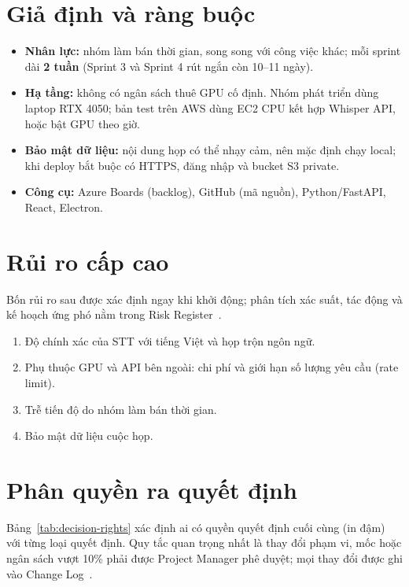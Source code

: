 \documentclass[12pt,a4paper]{report}
\begin{document}
\section{Giả định và ràng buộc}

\begin{itemize}
  \item \textbf{Nhân lực:} nhóm làm bán thời gian, song song với công việc khác; mỗi sprint dài
        \textbf{2 tuần} (Sprint 3 và Sprint 4 rút ngắn còn 10--11 ngày).
  \item \textbf{Hạ tầng:} không có ngân sách thuê GPU cố định. Nhóm phát triển dùng laptop RTX 4050; bản test
        trên AWS dùng EC2 CPU kết hợp Whisper API, hoặc bật GPU theo giờ.
  \item \textbf{Bảo mật dữ liệu:} nội dung họp có thể nhạy cảm, nên mặc định chạy local; khi deploy bắt buộc có
        HTTPS, đăng nhập và bucket S3 private.
  \item \textbf{Công cụ:} Azure Boards (backlog), GitHub (mã nguồn), Python/FastAPI, React, Electron.
\end{itemize}

\section{Rủi ro cấp cao}

Bốn rủi ro sau được xác định ngay khi khởi động; phân tích xác suất, tác động và kế hoạch ứng phó nằm trong
Risk Register~\cite{pmp}.
\begin{enumerate}
  \item Độ chính xác của STT với tiếng Việt và họp trộn ngôn ngữ.
  \item Phụ thuộc GPU và API bên ngoài: chi phí và giới hạn số lượng yêu cầu (rate limit).
  \item Trễ tiến độ do nhóm làm bán thời gian.
  \item Bảo mật dữ liệu cuộc họp.
\end{enumerate}

\section{Phân quyền ra quyết định}

Bảng~\ref{tab:decision-rights} xác định ai có quyền quyết định cuối cùng (in đậm) với từng loại quyết định. Quy
tắc quan trọng nhất là thay đổi phạm vi, mốc hoặc ngân sách vượt 10\% phải được Project Manager phê duyệt; mọi
thay đổi được ghi vào Change Log~\cite{mcr}.
\end{document}
